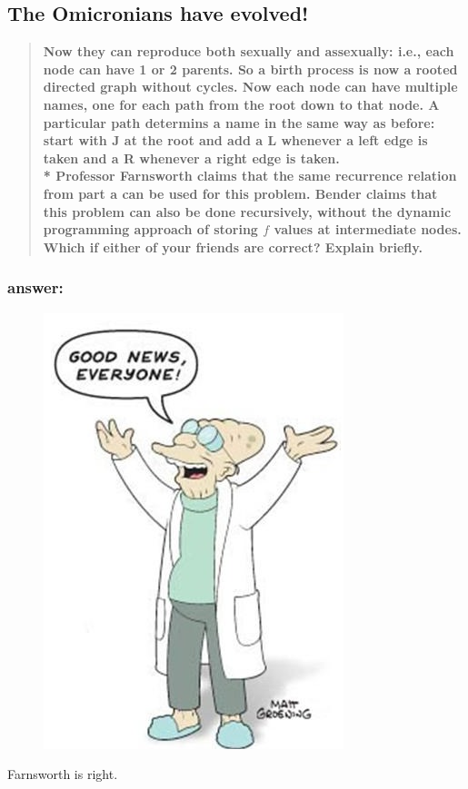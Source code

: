 \documentclass[titlepage]{article}
\theoremstyle{definition}
\begin{document}
  \subsection{The Omicronians have evolved!} 
  \begin{quote}
    \textbf{Now they can reproduce both sexually
    and assexually: i.e., each node can have 1 or 2 parents. So a birth process
    is now a rooted directed graph without cycles. Now each node can have
    multiple names, one for each path from the root down to that node. A
    particular path determins a name in the same way as before: start with J at
    the root and add a L whenever a left edge is taken and a R whenever a right
    edge is taken. \\*
    Professor Farnsworth claims that the same recurrence relation from part a
    can be used for this problem. Bender claims that this problem can also be
    done recursively, without the dynamic programming approach of storing $f$
    values at intermediate nodes. Which if either of your friends are correct?
    Explain briefly.}
  \end{quote}
    \subsubsection{answer: }
      \begin{figure}
        \centering
          \includegraphics[scale=0.3]{farnsworth}
        \end{figure}
      Farnsworth is right. 
\end{document}
